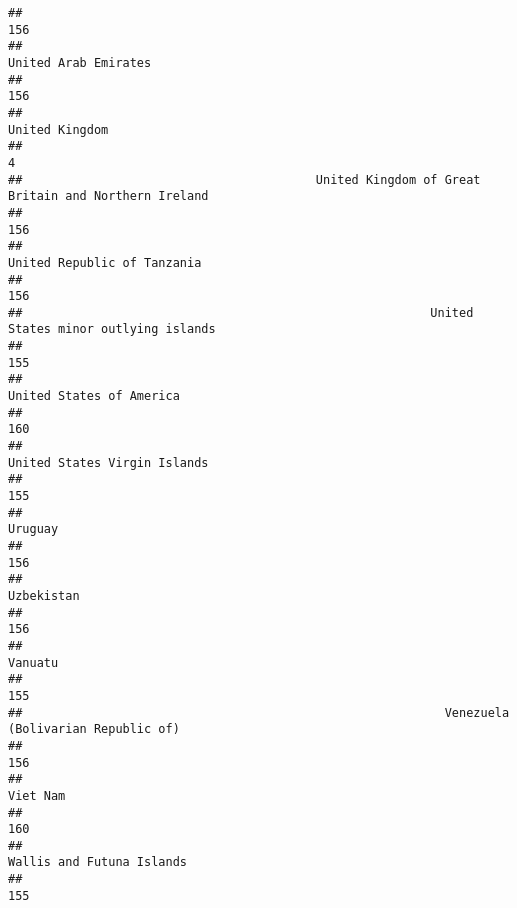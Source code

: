 \documentclass[]{article}
\begin{document}
\begin{verbatim}
##                                                                                          156 
##                                                                         United Arab Emirates 
##                                                                                          156 
##                                                                               United Kingdom 
##                                                                                            4 
##                                         United Kingdom of Great Britain and Northern Ireland 
##                                                                                          156 
##                                                                  United Republic of Tanzania 
##                                                                                          156 
##                                                         United States minor outlying islands 
##                                                                                          155 
##                                                                     United States of America 
##                                                                                          160 
##                                                                 United States Virgin Islands 
##                                                                                          155 
##                                                                                      Uruguay 
##                                                                                          156 
##                                                                                   Uzbekistan 
##                                                                                          156 
##                                                                                      Vanuatu 
##                                                                                          155 
##                                                           Venezuela (Bolivarian Republic of) 
##                                                                                          156 
##                                                                                     Viet Nam 
##                                                                                          160 
##                                                                    Wallis and Futuna Islands 
##                                                                                          155 

\end{verbatim}
\end{document}
